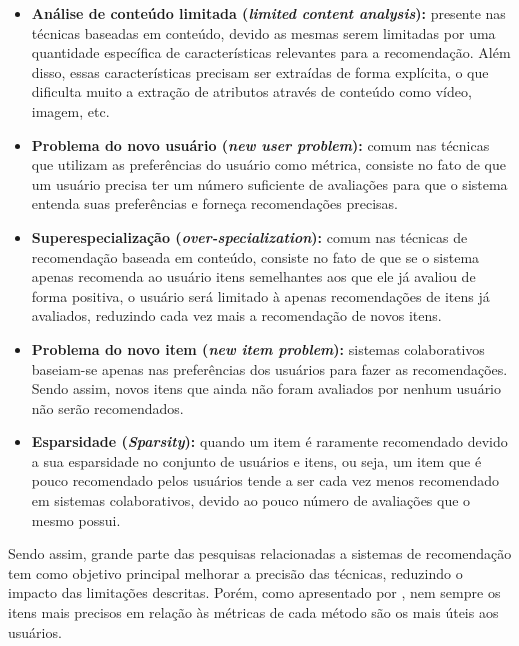 \documentclass[12pt, openright, oneside, a4paper, brazil]{abntex2}
\begin{document}
\begin{itemize}

	\item \textbf{Análise de conteúdo limitada (\textit{limited content analysis}):} presente nas técnicas baseadas em conteúdo, devido as mesmas serem limitadas por uma quantidade específica de características relevantes para a recomendação. Além disso, essas características precisam ser extraídas de forma explícita, o que dificulta muito a extração de atributos através de conteúdo como vídeo, imagem, etc.

	\item \textbf{Problema do novo usuário (\textit{new user problem}):} comum nas técnicas que utilizam as preferências do usuário como métrica, consiste no fato de que um usuário precisa ter um número suficiente de avaliações para que o sistema entenda suas preferências e forneça recomendações precisas.

	\item \textbf{Superespecialização (\textit{over-specialization}):} comum nas técnicas de recomendação baseada em conteúdo, consiste no fato de que se o sistema apenas recomenda ao usuário itens semelhantes aos que ele já avaliou de forma positiva, o usuário será limitado à apenas recomendações de itens já avaliados, reduzindo cada vez mais a recomendação de novos itens.

	\item \textbf{Problema do novo item (\textit{new item problem}):} sistemas colaborativos baseiam-se apenas nas preferências dos usuários para fazer as recomendações. Sendo assim, novos itens que ainda não foram avaliados por nenhum usuário não serão recomendados.

	\item \textbf{Esparsidade (\textit{Sparsity}):} quando um item é raramente recomendado devido a sua esparsidade no conjunto de usuários e itens, ou seja, um item que é pouco recomendado pelos usuários tende a ser cada vez menos recomendado em sistemas colaborativos, devido ao pouco número de avaliações que o mesmo possui.

\end{itemize}

Sendo assim, grande parte das pesquisas relacionadas a sistemas de recomendação tem como objetivo principal melhorar a precisão das técnicas, reduzindo o impacto das limitações descritas. Porém, como apresentado por , nem sempre os itens mais precisos em relação às métricas de cada método são os mais úteis aos usuários.
\end{document}
